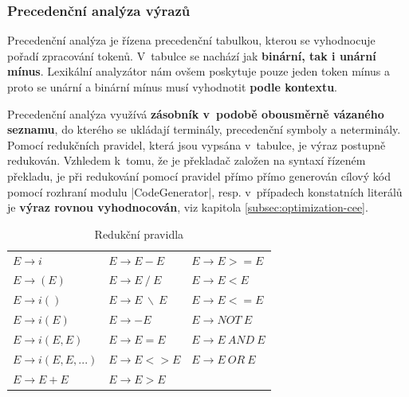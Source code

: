 \subsubsection{Precedenční analýza výrazů}

Precedenční analýza je řízena precedenční tabulkou, kterou se vyhodnocuje pořadí zpracování tokenů. V~tabulce se nachází jak \textbf{binární, tak i unární mínus}. Lexikální analyzátor nám ovšem poskytuje pouze jeden token mínus a proto se unární a binární mínus musí vyhodnotit \textbf{podle kontextu}.

Precedenční analýza využívá \textbf{zásobník v~podobě obousměrně vázaného seznamu}, do kterého se ukládají terminály, precedenční symboly a neterminály. Pomocí redukčních pravidel, která jsou vypsána v~tabulce, je výraz postupně redukován.
Vzhledem k~tomu, že je překladač založen na syntaxí řízeném překladu, je při redukování pomocí pravidel přímo přímo generován cílový kód pomocí rozhraní modulu \ic|CodeGenerator|, resp. v~případech konstatních literálů je \textbf{výraz rovnou vyhodnocován}, viz kapitola \ref{subsec:optimization-cee}.

\begin{table}[!htbp]
    \centering
    \label{tabul:prav}
    \caption{Redukční pravidla}
    \begin{tabular}{lll}
        $E \to i$ & $E \to E - E$ & $E \to E >= E$\\
        $E \to (E)$ & $E \to E ~ / ~ E$ & $E \to E < E$\\
        $E \to i()$ & $E \to E ~ \backslash ~ E$ & $E \to E <= E$\\
        $E \to i(E)$ & $E \to - E$ & $E \to NOT ~ E$\\
        $E \to i(E, E)$ & $E \to E = E$ & $E \to E ~ AND ~ E$\\
        $E \to i(E, E, ...)$ & $E \to E <> E$ & $E \to E ~ OR ~ E$\\
        $E \to E + E$ & $E \to E > E$\\
    \end{tabular}
\end{table}

